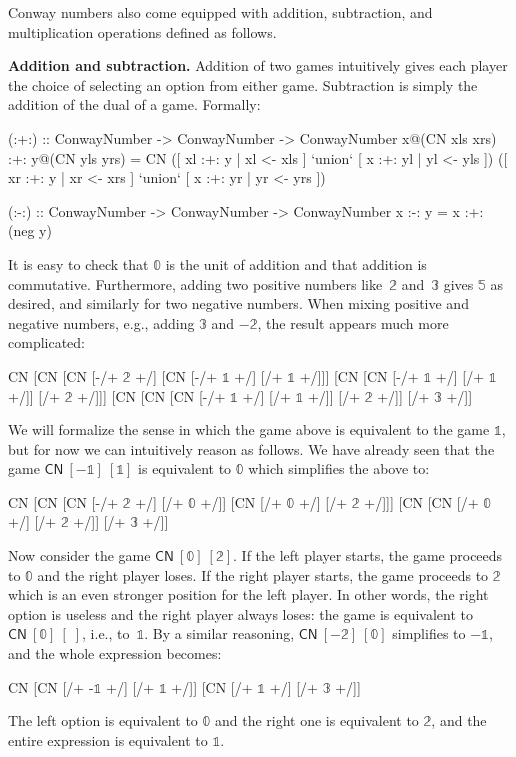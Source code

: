 \documentclass[authoryear,preprint]{sigplanconf}
\newcommand{\zerog}{\mathbb{0}}
\newcommand{\oneg}{\mathbb{1}}
\newcommand{\twog}{\mathbb{2}}
\newcommand{\threeg}{\mathbb{3}}
\newcommand{\fiveg}{\mathbb{5}}
\begin{document}
Conway numbers also come equipped with addition, subtraction, and
multiplication operations defined as follows.

\smallskip\noindent\textbf{Addition and subtraction.} Addition of two games
intuitively gives each player the choice of selecting an option from either
game. Subtraction is simply the addition of the dual of a game. Formally:
\begin{code}
(:+:) :: ConwayNumber -> ConwayNumber -> ConwayNumber
x@(CN xls xrs) :+: y@(CN yls yrs) = 
  CN 
    ([ xl :+: y | xl <- xls ] `union`
     [ x :+: yl | yl <- yls ])
    ([ xr :+: y | xr <- xrs ] `union`
     [ x :+: yr | yr <- yrs ])

(:-:) :: ConwayNumber -> ConwayNumber -> ConwayNumber
x :-: y = x :+: (neg y) 
\end{code}
It is easy to check that $\zerog$ is the unit of addition and that addition
is commutative. Furthermore, adding two positive numbers like~$\twog$
and~$\threeg$ gives $\fiveg$ as desired, and similarly for two negative
numbers. When mixing positive and negative numbers, e.g., adding $\threeg$
and $-\twog$, the result appears much more complicated:
\begin{code}
CN [CN  [CN  [-/+ $\twog$ +/] 
             [CN [-/+ $\oneg$ +/] [/+ $\oneg$ +/]]]
        [CN  [CN [-/+ $\oneg$ +/] [/+ $\oneg$ +/]] 
             [/+ $\twog$ +/]]] 
   [CN  [CN  [CN [-/+ $\oneg$ +/] [/+ $\oneg$ +/]] 
             [/+ $\twog$ +/]] 
        [/+ $\threeg$ +/]]
\end{code}
We will formalize the sense in which the game above is equivalent to the game
$\oneg$, but for now we can intuitively reason as follows. We have already
seen that the game $\textsf{CN}~[-\oneg]~[\oneg]$ is equivalent to $\zerog$
which simplifies the above to:
\begin{code}
CN [CN  [CN  [-/+ $\twog$ +/] [/+ $\zerog$ +/]]
        [CN  [/+ $\zerog$ +/] [/+ $\twog$ +/]]]
   [CN  [CN  [/+ $\zerog$ +/] [/+ $\twog$ +/]]
        [/+ $\threeg$ +/]]
\end{code}
Now consider the game $\textsf{CN}~[\zerog]~[\twog]$. If the left player
starts, the game proceeds to $\zerog$ and the right player loses. If the
right player starts, the game proceeds to $\twog$ which is an even stronger
position for the left player. In other words, the right option is useless and
the right player always loses: the game is equivalent to
$\textsf{CN}~[\zerog]~[\;]$, i.e., to~$\oneg$. By a similar reasoning,
$\textsf{CN}~[-\twog]~[\zerog]$ simplifies to $-\oneg$, and the whole
expression becomes:
\begin{code}
CN [CN  [/+ -$\oneg$ +/] [/+ $\oneg$ +/]]
   [CN  [/+ $\oneg$ +/] [/+ $\threeg$ +/]]
\end{code}
The left option is equivalent to $\zerog$ and the right one is equivalent to
$\twog$, and the entire expression is equivalent to $\oneg$.
\end{document}
